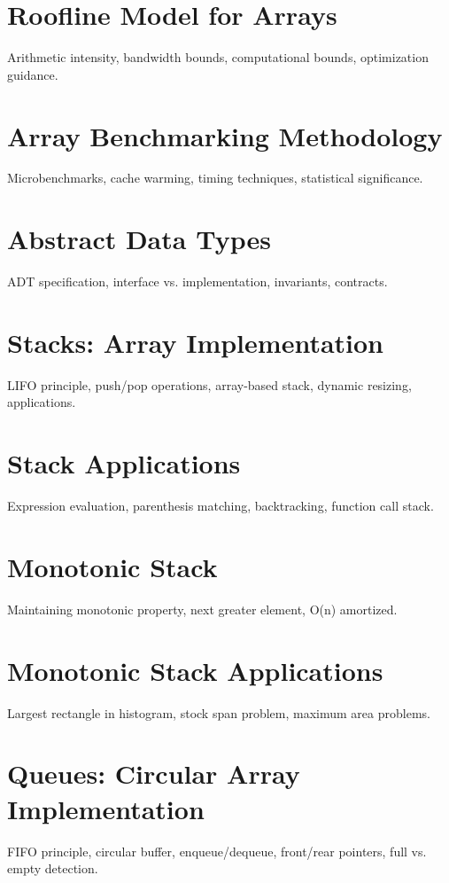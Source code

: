 \chapter{Roofline Model for Arrays}
Arithmetic intensity, bandwidth bounds, computational bounds, optimization guidance.

\chapter{Array Benchmarking Methodology}
Microbenchmarks, cache warming, timing techniques, statistical significance.


\chapter{Abstract Data Types}
ADT specification, interface vs. implementation, invariants, contracts.

\chapter{Stacks: Array Implementation}
LIFO principle, push/pop operations, array-based stack, dynamic resizing, applications.

\chapter{Stack Applications}
Expression evaluation, parenthesis matching, backtracking, function call stack.

\chapter{Monotonic Stack}
Maintaining monotonic property, next greater element, O(n) amortized.

\chapter{Monotonic Stack Applications}
Largest rectangle in histogram, stock span problem, maximum area problems.

\chapter{Queues: Circular Array Implementation}
FIFO principle, circular buffer, enqueue/dequeue, front/rear pointers, full vs. empty detection.

